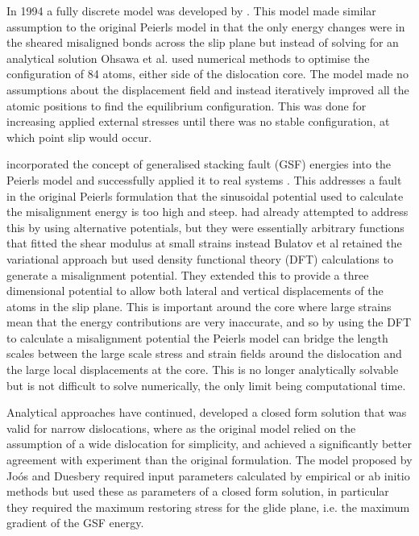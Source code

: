 In 1994 a fully discrete model was developed by \citet{Ohsawa1994}. This model made similar assumption to the original Peierls model in that the only energy changes were in the sheared misaligned bonds across the slip plane but instead of solving for an analytical solution Ohsawa et al. used numerical methods to optimise the configuration of 84 atoms,  either side of the dislocation core. The model made no assumptions about the displacement field and instead iteratively improved all the atomic positions to find the equilibrium configuration. This was done for increasing applied external stresses until there was no stable configuration, at which point slip would occur.



\citet{Bulatov1997} incorporated the concept of generalised stacking fault (GSF) energies into the Peierls model and successfully applied it to real systems \cite{Lu2000aluminium}. This addresses a fault in the original Peierls formulation that the sinusoidal potential used to calculate the misalignment energy is too high and steep. \citet{Ohsawa1994} had already attempted to address this by using alternative potentials, but they were essentially arbitrary functions that fitted the shear modulus at small strains instead Bulatov et al retained the variational approach but used density functional theory (DFT) calculations to generate a misalignment potential. They extended this to provide a three dimensional potential to allow both lateral and vertical displacements of the atoms in the slip plane. This is important around the core where large strains mean that the energy contributions are very inaccurate, and so by using the DFT to calculate a misalignment potential the Peierls model can bridge the length scales between the large scale stress and strain fields around the dislocation and the large local displacements at the core. This is no longer analytically solvable but is not difficult to solve numerically, the only limit being computational time.

Analytical approaches have continued, \citet{Joos1997} developed a closed form solution that was valid for narrow dislocations, where as the original model relied on the assumption of a wide dislocation for simplicity, and achieved a significantly better agreement with experiment than the original formulation. The model proposed by Joós and Duesbery required input parameters calculated by empirical or ab initio methods but used these as parameters of a closed form solution, in particular they required the maximum restoring stress for the glide plane, i.e. the maximum gradient of the GSF energy.


